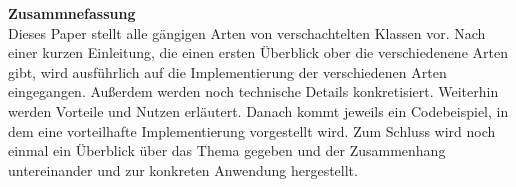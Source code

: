 \vspace*{2cm}
{\bf\Large Zusammnefassung} \\ [1em]
Dieses Paper stellt alle gängigen Arten von verschachtelten Klassen vor.
Nach einer kurzen Einleitung, die einen ersten Überblick ober die verschiedenene Arten gibt, wird ausführlich auf die Implementierung  der verschiedenen Arten eingegangen.
Außerdem werden noch technische Details konkretisiert. Weiterhin werden Vorteile und Nutzen erläutert.
Danach kommt jeweils ein Codebeispiel, in dem eine vorteilhafte Implementierung vorgestellt wird.
Zum Schluss wird noch einmal ein Überblick über das Thema gegeben und der Zusammenhang untereinander und zur konkreten Anwendung hergestellt.
\clearpage
